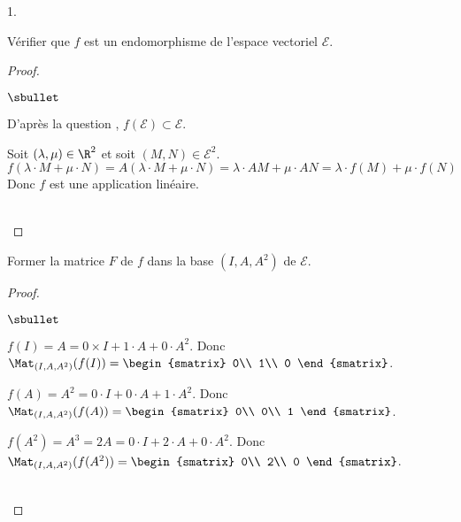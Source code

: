 \begin{noliste}{1.}
\setcounter{enumi}{6}
\item Vérifier que $f$ est un endomorphisme de l'espace vectoriel 
$\mathcal{E}$.

\begin{proof}~
 \begin{noliste}{$\sbullet$}
  \item D'après la question , $f(\mathcal{E}) \subset 
  \mathcal{E}$.
  
  \item Soit $(\lambda,\mu)\in\R^2$ et soit $(M,N)\in\mathcal{E}^2$.
 \[
  f(\lambda \cdot M+\mu \cdot N) = A(\lambda \cdot M+\mu \cdot 
  N)=\lambda \cdot AM + \mu \cdot AN 
  =\lambda \cdot f(M) + \mu \cdot f(N)
 \]
 Donc $f$ est une application linéaire.
 \end{noliste}
 ~\\[-1.2cm]
\end{proof}

\item Former la matrice $F$ de $f$ dans la base $(I,A,A^2)$ de 
$\mathcal{E}$.

\begin{proof}~
 \begin{noliste}{$\sbullet$}
 \item $f(I)=A=0\times I +1\cdot A + 0\cdot A^2$. Donc 
 $\Mat_{(I,A,A^2)}(f(I))=
 \begin{smatrix}
  0\\ 1\\ 0
 \end{smatrix}$.
 \item $f(A)=A^2=0\cdot I +0\cdot A + 1\cdot A^2$. Donc 
 $\Mat_{(I,A,A^2)}(f(A))=
 \begin{smatrix}
  0\\ 0\\ 1
 \end{smatrix}$.
 \item $f(A^2)=A^3=2A=0\cdot I +2\cdot A + 0\cdot A^2$. Donc 
  $\Mat_{(I,A,A^2)} 
  (f(A^2))=
  \begin{smatrix}
   0\\ 2\\ 0
  \end{smatrix}$.
 \end{noliste}
  ~\\[-1cm]
\end{proof}


\end{noliste}
